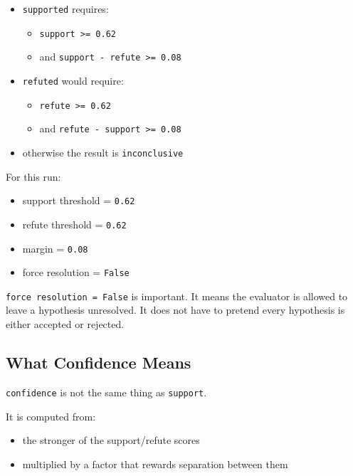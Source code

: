 \documentclass[
]{article}
\providecommand{\tightlist}{%
  \setlength{\itemsep}{0pt}\setlength{\parskip}{0pt}}
\begin{document}
\begin{itemize}
\tightlist
\item
  \texttt{supported} requires:

  \begin{itemize}
  \tightlist
  \item
    \texttt{support\ \textgreater{}=\ 0.62}
  \item
    and \texttt{support\ -\ refute\ \textgreater{}=\ 0.08}
  \end{itemize}
\item
  \texttt{refuted} would require:

  \begin{itemize}
  \tightlist
  \item
    \texttt{refute\ \textgreater{}=\ 0.62}
  \item
    and \texttt{refute\ -\ support\ \textgreater{}=\ 0.08}
  \end{itemize}
\item
  otherwise the result is \texttt{inconclusive}
\end{itemize}

For this run:

\begin{itemize}
\tightlist
\item
  support threshold = \texttt{0.62}
\item
  refute threshold = \texttt{0.62}
\item
  margin = \texttt{0.08}
\item
  force resolution = \texttt{False}
\end{itemize}

\texttt{force\ resolution\ =\ False} is important. It means the
evaluator is allowed to leave a hypothesis unresolved. It does not have
to pretend every hypothesis is either accepted or rejected.

\subsection{What Confidence Means}\label{what-confidence-means}

\texttt{confidence} is not the same thing as \texttt{support}.

It is computed from:

\begin{itemize}
\tightlist
\item
  the stronger of the support/refute scores
\item
  multiplied by a factor that rewards separation between them
\end{itemize}
\end{document}
